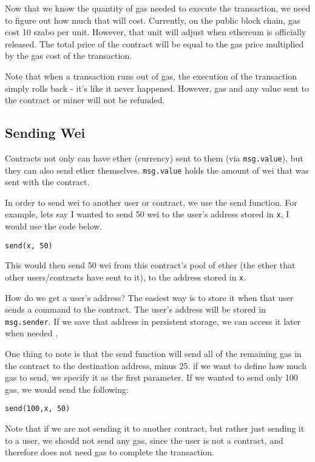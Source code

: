 \documentclass[12pt]{article}
\begin{document}
Now that we know the quantity of gas needed to execute the transaction, we need to figure out how much that will cost. Currently, on the public block chain, gas cost 10 szabo per unit. However, that unit will adjust when ethereum is officially released. The total price of the contract will be equal to the gas price multiplied by the gas cost of the transaction.

Note that when a transaction runs out of gas, the execution of the transaction simply rolls back - it's like it never happened. However, gas and any value sent to the contract or miner will not be refunded. \cite{Subtleties, WhatOptions}

\subsection{Sending Wei}
Contracts not only can have ether (currency) sent to them (via \texttt{msg.value}), but they can also send ether themselves. \texttt{msg.value} holds the amount of wei that was sent with the contract.

In order to send wei to another user or contract, we use the send function. For example, lets say I wanted to send 50 wei to the user's address stored in \texttt{x}, I would use the code below.

\begin{verbatim}
send(x, 50)
\end{verbatim}

This would then send 50 wei from this contract's pool of ether (the ether that other users/contracts have sent to it), to the address stored in \texttt{x}.

How do we get a user's address? The easiest way is to store it when that user sends a command to the contract. The user's address will be stored in \texttt{msg.sender}. If we save that address in persistent storage, we can access it later when needed \cite{Serpent}.

One thing to note is that the send function will send all of the remaining gas in the contract to the destination address, minus 25. if we want to define how much gas to send, we specify it as the first parameter. If we wanted to send only 100 gas, we would send the following: 

\begin{verbatim}
send(100,x, 50)
\end{verbatim}

Note that if we are not sending it to another contract, but rather just sending it to a user, we should not send any gas, since the user is not a contract, and therefore does not need gas to complete the transaction. 
\end{document}
